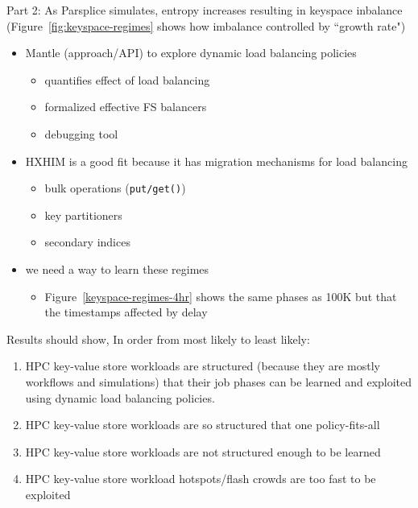 Part 2: As Parsplice simulates, entropy increases resulting in keyspace
inbalance (Figure~\ref{fig:keyspace-regimes} shows how imbalance controlled by
``growth rate")
\begin{itemize}
  \item Mantle (approach/API) to explore dynamic load balancing policies
  \begin{itemize}
    \item quantifies effect of load balancing
    \item formalized effective FS balancers
    \item debugging tool 
  \end{itemize}
  \item HXHIM is a good fit because it has migration mechanisms for load balancing
  \begin{itemize}
    \item bulk operations (\texttt{put/get()})
    \item key partitioners
    \item secondary indices
  \end{itemize}
  \item we need a way to learn these regimes
  \begin{itemize}
    \item Figure~\ref{keyspace-regimes-4hr} shows the same phases as 100K but that the timestamps affected by delay
  \end{itemize}
\end{itemize}

Results should show, In order from most likely to least likely:

\begin{enumerate}

  \item HPC key-value store workloads are structured (because they are mostly
  workflows and simulations) that their job phases can be learned and exploited
  using dynamic load balancing policies.

  \item HPC key-value store workloads are so structured that one
  policy-fits-all

  \item HPC key-value store workloads are not structured enough to be learned

  \item HPC key-value store workload hotspots/flash crowds are too fast to be
  exploited

\end{enumerate}



